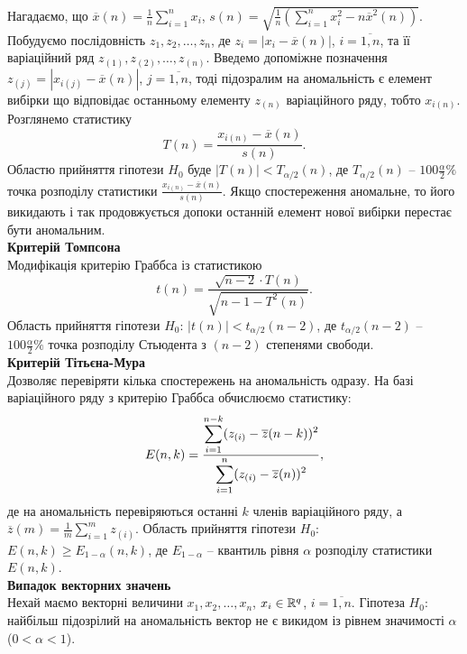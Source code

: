 Нагадаємо, що $\overline{x}(n) = \frac{1}{n} \sum_{i = 1}^n x_i$, $s(n) = \sqrt{\frac{1}{n} \left( \sum_{i = 1}^n x_i^2 - n \overline{x}^2(n) \right)}$. Побудуємо послідовність $z_1, z_2, \ldots, z_n$, де $z_i = |x_i - \overline{x}(n)|$, $i = \overline{1, n}$, та її варіаційний ряд $z_{(1)}, z_{(2)}, \ldots, z_{(n)}$. Введемо допоміжне позначення $z_{(j)} = \left| x_{i(j)} - \overline{x}(n) \right|$, $j = \overline{1, n}$, тоді підозралим на аномальність є елемент вибірки що відповідає останньому елементу $z_{(n)}$ варіаційного ряду, тобто $x_{i(n)}$. Розглянемо статистику \[ T(n) = \dfrac{x_{i(n)} - \overline{x}(n)}{s(n)}. \] Областю прийняття гіпотези $H_0$ буде $|T(n)| < T_{\alpha/2}(n)$, де $T_{\alpha/2}(n)$ -- $100\frac{\alpha}{2}\%$ точка розподілу статистики $\frac{x_{i(n)} - \overline{x}(n)}{s(n)}$. Якщо спостереження аномальне, то його викидають і так продовжується допоки останній елемент нової вибірки перестає бути аномальним. \\

\textbf{Критерій Томпсона} \\

Модифікація критерію Граббса із статистикою \[ t(n) = \dfrac{\sqrt{n - 2} \cdot T(n)}{\sqrt{n - 1 - T^2(n)}}. \] Область прийняття гіпотези $H_0$: $|t(n)| < t_{\alpha/2}(n - 2)$, де $t_{\alpha/2}(n - 2)$ -- $100\frac{\alpha}{2}\%$ точка розподілу Стьюдента з $(n - 2)$ степенями свободи. \\

\textbf{Критерій Тітьєна-Мура} \\

Дозволяє перевіряти кілька спостережень на аномальність одразу. На базі варіаційного ряду з критерію Граббса обчислюємо статистику: \[ E(n, k) = \dfrac{\displaystyle\sum\limits_{i = 1}^{n - k} (z_{(i)} - \overline{z}(n - k))^2}{\displaystyle\sum\limits_{i = 1}^n (z_{(i)} - \overline{z}(n))^2}, \] де на аномальність перевіряються останні $k$ членів варіаційного ряду, а $\overline{z}(m) = \frac{1}{m} \sum_{i = 1}^{m} z_{(i)}$. Область прийняття гіпотези $H_0$: $E(n, k) \ge E_{1 - \alpha} (n, k)$, де $E_{1 - \alpha}$ -- квантиль рівня $\alpha$ розподілу статистики $E(n, k)$. \\

\textbf{Випадок векторних значень} \\

Нехай маємо векторні величини $x_1, x_2, \ldots, x_n$, $x_i \in \mathbb{R}^q$, $i = \overline{1, n}$. Гіпотеза $H_0$: найбільш підозрілий на аномальність вектор не є викидом із рівнем значимості $\alpha$ ($0 < \alpha < 1$). \\

